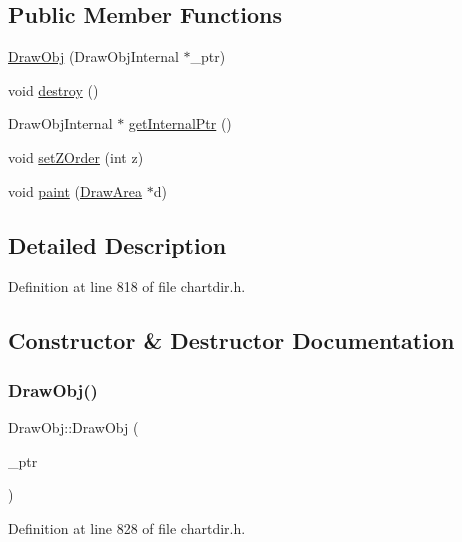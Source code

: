 \subsection*{Public Member Functions}
\begin{DoxyCompactItemize}
\item 
\hyperlink{class_draw_obj_a1cfbe2cac569abc4fcbfb8ad6bca94d7}{Draw\+Obj} (Draw\+Obj\+Internal $\ast$\+\_\+ptr)
\item 
void \hyperlink{class_draw_obj_a3f82f3fcf34f7eb28bb58760c58c397d}{destroy} ()
\item 
Draw\+Obj\+Internal $\ast$ \hyperlink{class_draw_obj_ab717fce3aea9b2f73e76f1ccbcc1aa68}{get\+Internal\+Ptr} ()
\item 
void \hyperlink{class_draw_obj_adb8e1622c6454c93d1060440ea94789c}{set\+Z\+Order} (int z)
\item 
void \hyperlink{class_draw_obj_a66d19f8866cfccfa8aab406d7ddd070b}{paint} (\hyperlink{class_draw_area}{Draw\+Area} $\ast$d)
\end{DoxyCompactItemize}


\subsection{Detailed Description}


Definition at line 818 of file chartdir.\+h.



\subsection{Constructor \& Destructor Documentation}
\mbox{\label{class_draw_obj_a1cfbe2cac569abc4fcbfb8ad6bca94d7}} 
\subsubsection{\texorpdfstring{Draw\+Obj()}{DrawObj()}}
{\footnotesize\ttfamily Draw\+Obj\+::\+Draw\+Obj (\begin{DoxyParamCaption}\item[{Draw\+Obj\+Internal $\ast$}]{\+\_\+ptr }\end{DoxyParamCaption})\hspace{0.3cm}{\ttfamily [inline]}}



Definition at line 828 of file chartdir.\+h.



